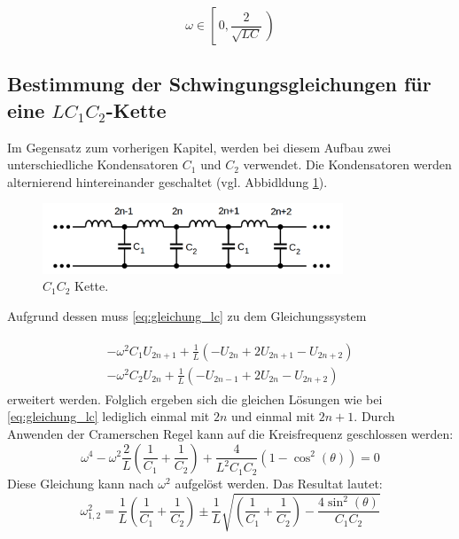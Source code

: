 \begin{equation}
\label{eq:menge_omega_lc_glied}
\omega\in\left[\,0,\frac{2}{\sqrt{LC}}\,\right)
\end{equation}

\subsection{Bestimmung der Schwingungsgleichungen für eine $LC_1C_2$-Kette}
Im Gegensatz zum vorherigen Kapitel, werden bei diesem Aufbau zwei unterschiedliche
Kondensatoren $C_1$ und $C_2$ verwendet. Die Kondensatoren werden
alternierend hintereinander geschaltet (vgl. Abbidldung \ref{fig:alternierende_kette}).

\begin{figure}
  \centering
  \includegraphics[width=0.8\textwidth]{bilder/alternierende_kette.png}
  \caption{$C_1C_2$ Kette.\cite{anleitung356}}
  \label{fig:alternierende_kette}
\end{figure}


Aufgrund dessen muss \eqref{eq:gleichung_lc} zu dem Gleichungssystem

\begin{align}
\label{eq:lc1c2_gleichungsy}
\begin{aligned}
-\omega^2C_1U_{2n+1}+\frac{1}{L}\left(-U_{2n}+2U_{2n+1}-U_{2n+2}\right)\\
-\omega^2C_2U_{2n}+\frac{1}{L}\left(-U_{2n-1}+2U_{2n}-U_{2n+2}\right)
\end{aligned}
\end{align}
erweitert werden.
Folglich ergeben sich die gleichen Lösungen wie bei \eqref{eq:gleichung_lc}
lediglich einmal mit $2n$ und einmal mit $2n+1$.
Durch Anwenden der Cramerschen Regel kann auf die Kreisfrequenz geschlossen werden: %
\begin{equation*}
\omega^4-\omega^2\frac{2}{L}\left(\frac{1}{C_1}+\frac{1}{C_2}\right)+\frac{4}{L^2C_1C_2}\left(1-\cos^2(\theta)\right)=0
\end{equation*}
Diese Gleichung kann nach $\omega^2$ aufgelöst werden.
Das Resultat lautet: %
\begin{equation}
\label{eq:omega_ceins_czwei}
\omega_{1,2}^{2}=\frac{1}{L}\left(\frac{1}{C_1}+\frac{1}{C_2}\right)\pm\frac{1}{L}\sqrt{\left(\frac{1}{C_1}+\frac{1}{C_2}\right)-\frac{4\sin^2(\theta)}{C_1C_2}}
\end{equation}

